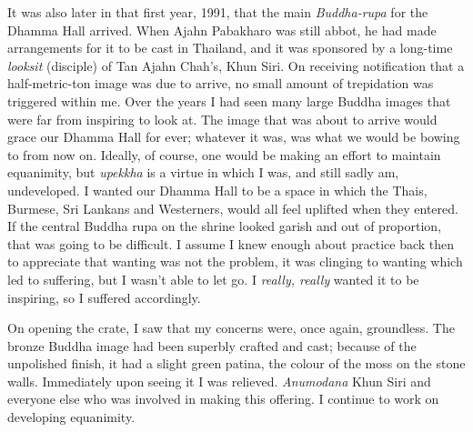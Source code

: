 It was also later in that first year, 1991, that the main
\emph{Buddha-rupa} for the Dhamma Hall arrived. When Ajahn Pabakharo was
still abbot, he had made arrangements for it to be cast in Thailand, and
it was sponsored by a long-time \emph{looksit} (disciple) of Tan Ajahn
Chah's, Khun Siri. On receiving notification that a half-metric-ton
image was due to arrive, no small amount of trepidation was triggered
within me. Over the years I had seen many large Buddha images that were
far from inspiring to look at. The image that was about to arrive would
grace our Dhamma Hall for ever; whatever it was, was what we would be
bowing to from now on. Ideally, of course, one would be making an effort
to maintain equanimity, but \emph{upekkha} is a virtue in which I was,
and still sadly am, undeveloped. I wanted our Dhamma Hall to be a space
in which the Thais, Burmese, Sri Lankans and Westerners, would all feel
uplifted when they entered. If the central Buddha rupa on the shrine
looked garish and out of proportion, that was going to be difficult. I
assume I knew enough about practice back then to appreciate that wanting
was not the problem, it was clinging to wanting which led to suffering,
but I wasn't able to let go. I \emph{really, really} wanted it to be
inspiring, so I suffered accordingly.

On opening the crate, I saw that my concerns were, once again,
groundless. The bronze Buddha image had been superbly crafted and cast;
because of the unpolished finish, it had a slight green patina, the
colour of the moss on the stone walls. Immediately upon seeing it I was
relieved. \emph{Anumodana} Khun Siri and everyone else who was involved
in making this offering. I continue to work on developing
equanimity.

